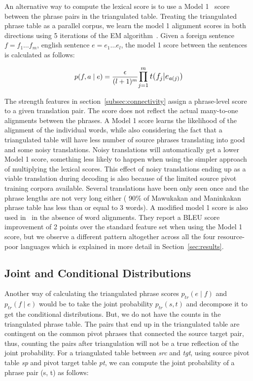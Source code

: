         An alternative way to compute the lexical score is to use a Model 1~\cite{Brown:1993} score between the phrase pairs in the triangulated table. Treating the triangulated phrase table as a parallel corpus, we learn the model 1 alignment scores in both directions using 5 iterations of the EM algorithm~\cite{Dempster:77}. Given a foreign sentence $f = f_{1} \ldots f_{m}$, english sentence $e = e_{1} \ldots e_{l}$, the model 1 score between the sentences is calculated as follows:

                \begin{equation}
                        p(f, a \mid e) = \frac{\epsilon}{(l+1)^m}\mathlarger{\prod\limits_{j=1}^{m}t(f_{j}|e_{a(j)})}
                \end{equation}

        The strength features in section~\ref{subsec:connectivity} assign a phrase-level score to a given translation pair. The score does not reflect the actual many-to-one alignments between the phrases. A Model 1 score learns the likelihood of the alignment of the individual words, while also considering the fact that a triangulated table will have less number of source phrases translating into good and some noisy translations. Noisy translations will automatically get a lower Model 1 score, something less likely to happen when using the simpler approach of multiplying the lexical scores. This effect of noisy translations ending up as a viable translation during decoding is also because of the limited source pivot training corpora available. Several translations have been only seen once and the phrase lengths are not very long either ( 90\% of Mawukakan and Maninkakan phrase table has less than or equal to 3 words). A modified model 1 score is also used in~\cite{Cohn:07} in the absence of word alignments. They report a BLEU score improvement of 2 points over the standard feature set when using the Model 1 score, but we observe a different pattern altogether across all the four resource-poor languages which is explained in more detail in Section~\ref{sec:results}.

\subsection{Joint and Conditional Distributions}
\label{subsec:joint}

Another way of calculating the triangulated phrase scores $p_{tr}(e \mid f)$ and $p_{tr}(f \mid e)$ would be to take the joint probability $p_{tr}(s, t)$ and decompose it to get the conditional distributions. But, we do not have the counts in the triangulated phrase table. The pairs that end up in the triangulated table are contingent on the common pivot phrases that connected the source target pair, thus, counting the pairs after triangulation will not be a true reflection of the joint probability. For a triangulated table between \emph{src} and \emph{tgt}, using source pivot table \emph{sp} and pivot target table \emph{pt}, we can compute the joint probability of a phrase pair (s, t) as follows:

